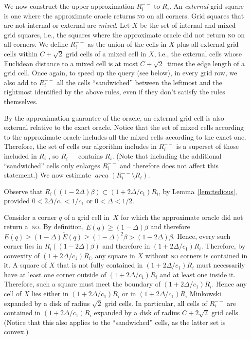 \documentclass[11pt]{article}
\theoremstyle{remark}
\DeclareMathOperator{\area}{\mathit{area}}
\def\EE{\tilde{E}}
\begin{document}
\begin{enumerate}[(i)]
We now construct the upper approximation $R^{--}_i$ to $R_i$.
An \emph{external} grid square is one where the approximate oracle returns \textsc{no} on all corners.  Grid squares that are not internal or external are \emph{mixed}. 
Let $X$ be the set of internal and mixed grid squares, i.e., the squares where the approximate oracle did not return \textsc{no} on all corners.  We define $R^{--}_i$ as the union of the cells in $X$ plus all external grid cells within $C+\sqrt2$ grid cells of a mixed cell in $X$, i.e., the external cells whose Euclidean distance to a mixed cell is at most $C+\sqrt2$~times the edge length of a grid cell.  Once again, to speed up the query (see below), in every grid row, we also add to $R^{--}_i$ all the cells ``sandwiched'' between the leftmost and the rightmost identified by the above rules, even if they don't satisfy the rules themselves.

By the approximation guarantee of the oracle, an external grid cell is also external relative to the exact oracle.
Notice that the set of mixed cells according to the approximate oracle includes all the mixed cells according to the exact one.  
Therefore, the set of cells our algorithm includes in $R_i^{--}$ is a superset of those included in $R_i^-$, so  $R_i^{--}$ contains $R_i$.  (Note that including the additional ``sandwiched'' cells only enlarges $R^{--}_i$ and therefore does not affect this statement.) 
We now estimate $\area(R_i^{--}\setminus R_i)$.

Observe that $R_i((1-2\Delta)\beta) \subset (1+2\Delta/c_1)R_i$, by Lemma~\ref{lem:tedious}, provided $0 < 2 \Delta/c_1 < 1/c_1$ or $0 < \Delta < 1/2$.

Consider a corner $q$ of a grid cell in~$X$ for which the approximate oracle did not return a~\textsc{no}. By definition, $\EE(q) \geq (1 - \Delta)\beta$ and therefore $E(q) \geq (1-\Delta)\EE(q) \geq (1 - \Delta)^2 \beta > (1 - 2\Delta)\beta$. Hence, every such corner lies in $R_i((1-2\Delta)\beta)$ and therefore in $(1+2\Delta/c_1)R_i$.
Therefore, by convexity of $(1+2\Delta/c_1)R_i$, any square in $X$ without \textsc{no} corners is contained in it.  A square of $X$ that is not fully contained in $(1+2\Delta/c_1)R_i$ must necessarily have at least one corner outside of $(1+2\Delta/c_1)R_i$ and at least one inside it.  Therefore, such a square must meet the boundary of $(1+2\Delta/c_1)R_i$.  Hence any cell of $X$ lies either in $(1+2\Delta/c_1)R_i$ or in $(1+2\Delta/c_1)R_i$ Minkowski expanded by a disk of radius $\sqrt2$ grid cells.  In particular, all cells of $R^{--}_i$ are contained in $(1+2\Delta/c_1)R_i$ expanded by a disk of radius $C+2\sqrt2$ grid cells.  (Notice that this also applies to the ``sandwiched'' cells, as the latter set is convex.)


\end{enumerate}
\end{document}
